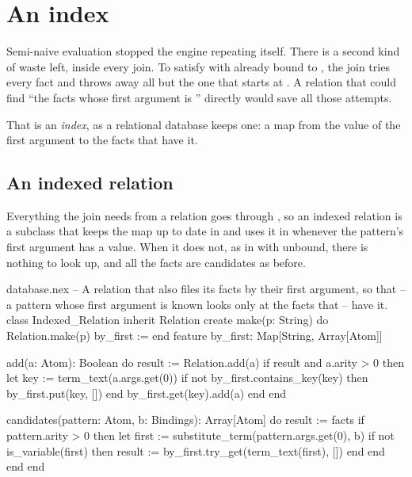 \chapter{An index}\label{ch:indexing}

Semi-naive evaluation stopped the engine repeating itself. There is a second
kind of waste left, inside every join. To satisfy  with
 already bound to , the join tries every  fact
and throws away all but the one that starts at . A relation that
could find ``the facts whose first argument is '' directly would
save all those attempts.

That is an \emph{index}, as a relational database keeps one: a map from the
value of the first argument to the facts that have it.

\section{An indexed relation}

Everything the join needs from a relation goes through ,
so an indexed relation is a subclass that keeps the map up to date in
 and uses it in  whenever the pattern's first
argument has a value. When it does not, as in  with
 unbound, there is nothing to look up, and all the facts are
candidates as before.

\begin{append}{database.nex}
-- A relation that also files its facts by their first argument, so that
-- a pattern whose first argument is known looks only at the facts that
-- have it.
class Indexed_Relation inherit Relation
create
  make(p: String)
  do
    Relation.make(p)
    by_first := {}
  end
feature
  by_first: Map[String, Array[Atom]]

  add(a: Atom): Boolean
  do
    result := Relation.add(a)
    if result and a.arity > 0 then
      let key := term_text(a.args.get(0))
      if not by_first.contains_key(key) then
        by_first.put(key, [])
      end
      by_first.get(key).add(a)
    end
  end

  candidates(pattern: Atom, b: Bindings): Array[Atom]
  do
    result := facts
    if pattern.arity > 0 then
      let first := substitute_term(pattern.args.get(0), b)
      if not is_variable(first) then
        result := by_first.try_get(term_text(first), [])
      end
    end
  end
end
\end{append}

